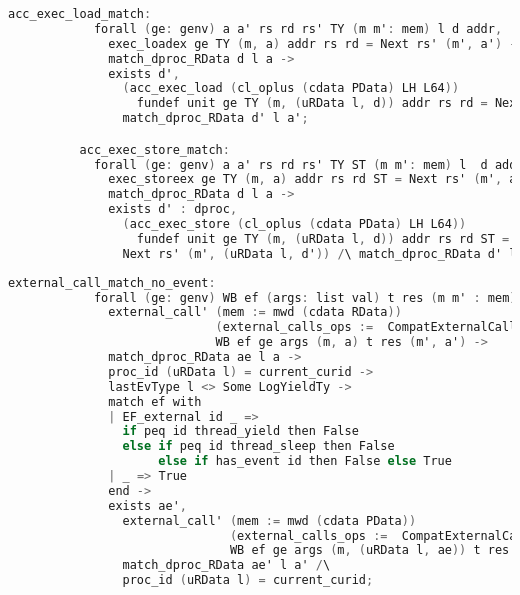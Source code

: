 \begin{lstlisting}[language=C]
          acc_exec_load_match:
            forall (ge: genv) a a' rs rd rs' TY (m m': mem) l d addr,
              exec_loadex ge TY (m, a) addr rs rd = Next rs' (m', a') ->
              match_dproc_RData d l a ->
              exists d',
                (acc_exec_load (cl_oplus (cdata PData) LH L64)) 
                  fundef unit ge TY (m, (uRData l, d)) addr rs rd = Next rs' (m', (uRData l, d')) /\
                match_dproc_RData d' l a';

          acc_exec_store_match:
            forall (ge: genv) a a' rs rd rs' TY ST (m m': mem) l  d addr,           
              exec_storeex ge TY (m, a) addr rs rd ST = Next rs' (m', a') ->
              match_dproc_RData d l a ->
              exists d' : dproc,
                (acc_exec_store (cl_oplus (cdata PData) LH L64)) 
                  fundef unit ge TY (m, (uRData l, d)) addr rs rd ST =
                Next rs' (m', (uRData l, d')) /\ match_dproc_RData d' l a';
\end{lstlisting}

\begin{lstlisting}[language=C]
          external_call_match_no_event:
            forall (ge: genv) WB ef (args: list val) t res (m m' : mem) (a a': RData) ae l,
              external_call' (mem := mwd (cdata RData)) 
                             (external_calls_ops :=  CompatExternalCalls.compatlayer_extcall_ops (phthread <@$\oplus$@>  L64))
                             WB ef ge args (m, a) t res (m', a') ->
              match_dproc_RData ae l a ->
              proc_id (uRData l) = current_curid ->
              lastEvType l <> Some LogYieldTy ->
              match ef with
              | EF_external id _ => 
                if peq id thread_yield then False
                else if peq id thread_sleep then False
                     else if has_event id then False else True
              | _ => True
              end -> 
              exists ae',
                external_call' (mem := mwd (cdata PData)) 
                               (external_calls_ops :=  CompatExternalCalls.compatlayer_extcall_ops (LH <@$\oplus$@>  L64))
                               WB ef ge args (m, (uRData l, ae)) t res (m', (uRData l, ae')) /\
                match_dproc_RData ae' l a' /\
                proc_id (uRData l) = current_curid;
\end{lstlisting}


